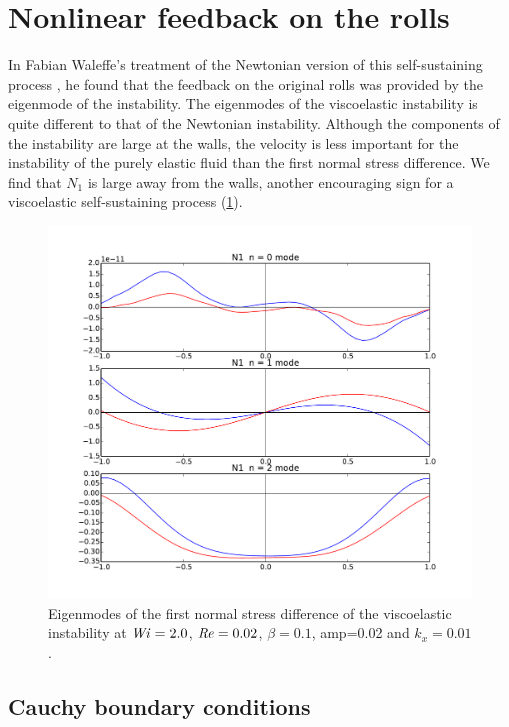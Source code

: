 \documentclass{jfm}
\newcommand\Wi{\mbox{\textit{Wi}}}
\newcommand\Rey{\mbox{\textit{Re}}}  %
\begin{document}
\section{Nonlinear feedback on the rolls}\label{sec:nonlinear_feedback}

In Fabian Waleffe's treatment of the Newtonian version of this self-sustaining process \cite{Waleffe1997}, he found that the feedback on the original rolls was provided by the eigenmode of the instability. The eigenmodes of the viscoelastic instability is quite different to that of the Newtonian instability. Although the components of the instability are large at the walls, the velocity is less important for the instability of the purely elastic fluid than the first normal stress difference. We find that $N_{1}$ is large away from the walls, another encouraging sign for a viscoelastic self-sustaining process (\ref{fig:eigenmode_visco}).

\begin{figure}
    \centering
    \includegraphics[width=\textwidth]{./figures/eigenmode_visco}
    \caption{Eigenmodes of the first normal stress difference of the viscoelastic instability at $\Wi = 2.0$, $\Rey = 0.02$, $\beta=0.1$, amp=0.02 and $k_x = 0.01$.}
    \label{fig:eigenmode_visco}
\end{figure}

\subsection{Cauchy boundary conditions}\label{sec:Cauchy}
\end{document}
